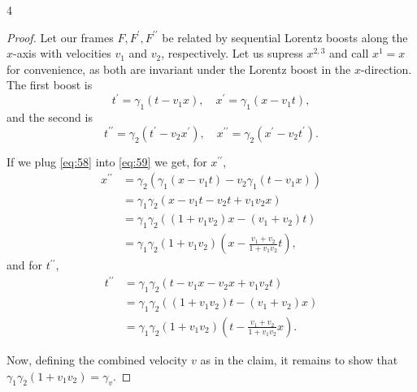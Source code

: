 \documentclass[11pt]{article}
\begin{document}
\begin{problem}{4}
\begin{enumerate}[label=(\alph*)]
\begin{proof}
            Let our frames \( F, F^{\prime}, F^{\prime\prime} \) be related by sequential Lorentz boosts along the \( x \)-axis with velocities \( v_{1} \) and \( v_2 \), respectively.
            Let us supress \( x^{2,3} \) and call \( x^1 = x \) for convenience, as both are invariant under the Lorentz boost in the \( x \)-direction.
            The first boost is
            \begin{equation}
            \label{eq:58}
            t^{\prime} = \gamma_1(t- v_1x), \quad x^{\prime} = \gamma_1(x- v_1t),
            \end{equation}
            and the second is
            \begin{equation}
            \label{eq:59}
            t^{\prime\prime} = \gamma_2(t^{\prime} - v_2x^{\prime}), \quad x^{\prime\prime} = \gamma_2(x^{\prime} - v_2 t^{\prime}).
            \end{equation}

            If we plug \cref{eq:58} into \cref{eq:59} we get, for \( x^{\prime\prime} \),
            \begin{equation}
            \begin{aligned}
            \label{eq:60}
              x^{\prime\prime} &= \gamma_2 \left( \gamma_1(x - v_1t) - v_2\gamma_1(t - v_1x) \right) \\
                     &= \gamma_{1}\gamma_2\left(x - v_1t - v_2t + v_1v_2x\right) \\
                     &= \gamma_1\gamma_2 \left( (1+v_1v_2)x - (v_1+v_2)t \right) \\
              &= \gamma_1\gamma_2(1+v_1v_2) \left( x - \frac{v_{1} + v_2}{1 + v_1v_2}t \right),
            \end{aligned}
            \end{equation}
            and for \( t^{\prime\prime} \),
            \begin{equation}
            \begin{aligned}
            \label{eq:61}
              t^{\prime\prime} &= \gamma_1\gamma_2 \left( t - v_1x - v_2x + v_1v_2t \right) \\
                     &= \gamma_1\gamma_2 \left( (1+v_1v_2)t - (v_1 + v_2)x \right) \\
              &= \gamma_1\gamma_2(1+v_1v_2) \left( t - \frac{v_1+v_2}{1 + v_1v_2}x \right).
            \end{aligned}
            \end{equation}

            Now, defining the combined velocity \( v \) as in the claim, it remains to show that \( \gamma_1\gamma_2(1+v_1v_2) = \gamma_v \).


\end{proof}
\end{enumerate}
\end{problem}
\end{document}
